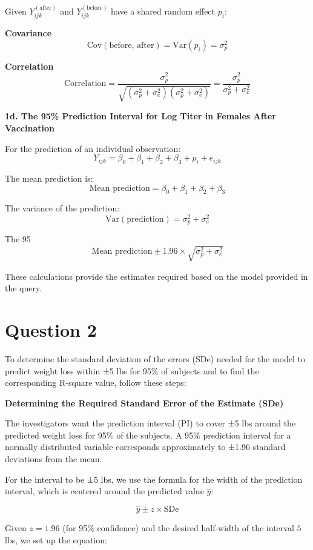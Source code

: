 \documentclass{article}
\begin{document}
Given \( Y_{ijk}^{(\text{after})} \) and \( Y_{ijk}^{(\text{before})} \) have a shared random effect \( p_i \):

\textbf{Covariance}
\[ \text{Cov}(\text{before, after}) = \text{Var}(p_i) = \sigma_p^2 \]

\textbf{Correlation}
\[ \text{Correlation} = \frac{\sigma_p^2}{\sqrt{(\sigma_p^2 + \sigma_e^2)(\sigma_p^2 + \sigma_e^2)}} = \frac{\sigma_p^2}{\sigma_p^2 + \sigma_e^2} \]

\textbf{1d. The 95\% Prediction Interval for Log Titer in Females After Vaccination}

For the prediction of an individual observation:
\[ Y_{ijk} = \beta_0 + \beta_1 + \beta_2 + \beta_3 + p_i + e_{ijk} \]

The mean prediction is:
\[ \text{Mean prediction} = \beta_0 + \beta_1 + \beta_2 + \beta_3 \]

The variance of the prediction:
\[ \text{Var}(\text{prediction}) = \sigma_p^2 + \sigma_e^2 \]

The 95%
\[ \text{Mean prediction} \pm 1.96 \times \sqrt{\sigma_p^2 + \sigma_e^2} \]

These calculations provide the estimates required based on the model provided in the query.

\section{Question 2}

To determine the standard deviation of the errors (SDe) needed for the model to predict weight loss within ±5 lbs for 95\% of subjects and to find the corresponding R-square value, follow these steps:

\textbf{Determining the Required Standard Error of the Estimate (SDe)}

The investigators want the prediction interval (PI) to cover ±5 lbs around the predicted weight loss for 95\% of the subjects. A 95\% prediction interval for a normally distributed variable corresponds approximately to ±1.96 standard deviations from the mean.

For the interval to be ±5 lbs, we use the formula for the width of the prediction interval, which is centered around the predicted value \( \hat{y} \):

\[
\hat{y} \pm z \times \text{SDe}
\]

Given \( z = 1.96 \) (for 95\% confidence) and the desired half-width of the interval \( 5 \) lbs, we set up the equation:
\end{document}
